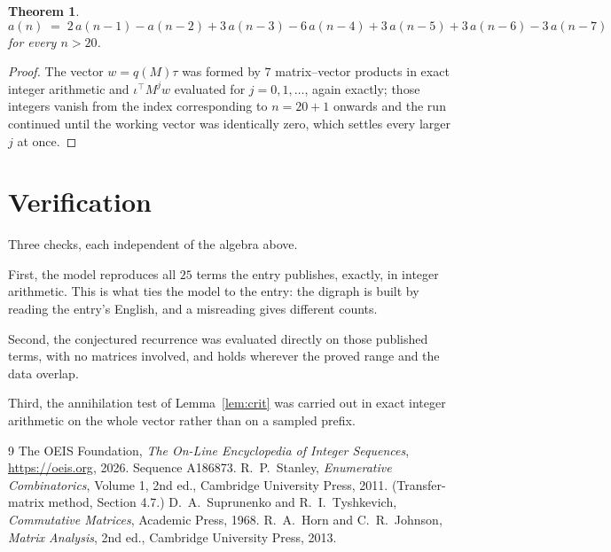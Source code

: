 \documentclass[11pt,a4paper]{article}
\theoremstyle{plain}
\newtheorem{theorem}{Theorem}
\theoremstyle{definition}
\begin{document}
\begin{theorem}
\[
a(n)\;=\;2\,a(n-1) - a(n-2) + 3\,a(n-3) - 6\,a(n-4) + 3\,a(n-5) + 3\,a(n-6) - 3\,a(n-7)
\]
for every $n>20$.
\end{theorem}

\begin{proof}
The vector $w=q(M)\tau$ was formed by $7$ matrix--vector products in exact integer
arithmetic and $\iota^{\!\top}M^{j}w$ evaluated for $j=0,1,\dots$, again exactly; those
integers vanish from the index corresponding to $n=20+1$ onwards and the run continued
until the working vector was identically zero, which settles every larger $j$ at once.
\end{proof}

\section{Verification}

Three checks, each independent of the algebra above.

First, the model reproduces all $25$ terms the entry publishes, exactly, in integer
arithmetic. This is what ties the model to the entry: the digraph is built by reading the
entry's English, and a misreading gives different counts.

Second, the conjectured recurrence was evaluated directly on those published terms, with no
matrices involved, and holds wherever the proved range and the data overlap.

Third, the annihilation test of Lemma~\ref{lem:crit} was carried out in exact integer
arithmetic on the whole vector rather than on a sampled prefix.

\begin{thebibliography}{9}
 The OEIS Foundation, \emph{The On-Line Encyclopedia of Integer
Sequences}, \url{https://oeis.org}, 2026. Sequence A186873.
 R.~P.~Stanley, \emph{Enumerative Combinatorics}, Volume 1, 2nd ed.,
Cambridge University Press, 2011. (Transfer-matrix method, Section 4.7.)
 D.~A.~Suprunenko and R.~I.~Tyshkevich, \emph{Commutative Matrices},
Academic Press, 1968.
 R.~A.~Horn and C.~R.~Johnson, \emph{Matrix Analysis}, 2nd ed., Cambridge
University Press, 2013.
\end{thebibliography}
\end{document}
